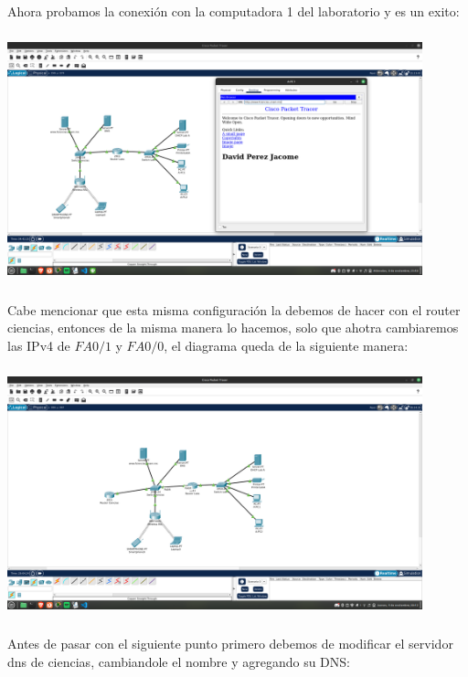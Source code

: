 \documentclass[14pt]{book}
\begin{document}
Ahora probamos la conexión con la computadora 1 del laboratorio y es un exito:\\

\includegraphics[width=12cm, height=8cm]{images/conexion laba.png}\\

Cabe mencionar que esta misma configuración la debemos de hacer con el router ciencias, entonces de la misma manera lo hacemos, solo que ahotra cambiaremos las IPv4
de $FA0/1$ y $FA0/0$, el diagrama queda de la siguiente manera:\\

\includegraphics[width=12cm, height=8cm]{images/router ciencias.png}\\

Antes de pasar con el siguiente punto primero debemos de modificar el servidor dns de ciencias, cambiandole el nombre y agregando su DNS:\\
\end{document}
